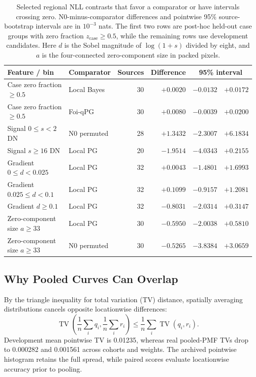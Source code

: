 \documentclass[10pt,twocolumn,journal]{IEEEtran}
\begin{document}
\begin{table}[t]
\centering
\caption{Selected regional NLL contrasts that favor a comparator or have intervals crossing zero. N0-minus-comparator differences and pointwise 95\% source-bootstrap intervals are in $10^{-3}$ nats. The first two rows are post-hoc held-out case groups with zero fraction $z_{\mathrm{case}}\geq0.5$, while the remaining rows use development candidates. Here $d$ is the Sobel magnitude of $\log(1+s)$ divided by eight, and $a$ is the four-connected zero-component size in packed pixels.}
\label{tab:adverse}
\begin{tabular}{@{}llrrrr@{}}
\toprule
Feature / bin & Comparator & Sources & Difference & \multicolumn{2}{c}{95\% interval}\\
\midrule
Case zero fraction $\geq0.5$ & Local Bayes & 30 & $+0.0020$ & $-0.0132$ & $+0.0172$\\
Case zero fraction $\geq0.5$ & Foi-qPG & 30 & $+0.0080$ & $-0.0039$ & $+0.0200$\\
Signal $0\leq s<2$ DN & N0 permuted & 28 & $+1.3432$ & $-2.3007$ & $+6.1834$\\
Signal $s\geq16$ DN & Local PG & 20 & $-1.9514$ & $-4.0343$ & $+0.2155$\\
Gradient $0\leq d<0.025$ & Local PG & 32 & $+0.0043$ & $-1.4801$ & $+1.6993$\\
Gradient $0.025\leq d<0.1$ & Local PG & 32 & $+0.1099$ & $-0.9157$ & $+1.2081$\\
Gradient $d\geq0.1$ & Local PG & 32 & $-0.8031$ & $-2.0314$ & $+0.3147$\\
Zero-component size $a\geq33$ & Local PG & 30 & $-0.5950$ & $-2.0038$ & $+0.5810$\\
Zero-component size $a\geq33$ & N0 permuted & 30 & $-0.5265$ & $-3.8384$ & $+3.0659$\\
\bottomrule
\end{tabular}
\end{table}

\subsection{Why Pooled Curves Can Overlap}
By the triangle inequality for total variation (TV) distance, spatially averaging distributions cancels opposite locationwise differences:
\begin{equation}
\operatorname{TV}\!\left(\frac1n\sum_iq_i,\frac1n\sum_ir_i\right)
\leq\frac1n\sum_i\operatorname{TV}(q_i,r_i).
\end{equation}
Development mean pointwise TV is 0.01235, whereas real pooled-PMF TVs drop to 0.000282 and 0.001561 across cohorts and weights. The archived pointwise histogram retains the full spread, while paired scores evaluate locationwise accuracy prior to pooling.
\end{document}
